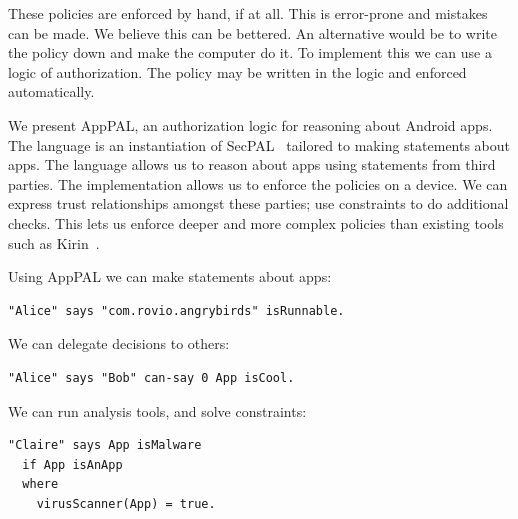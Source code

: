 \documentclass[]{scrartcl}
\newcommand{\comment}[1]{}%
\begin{document}
These policies are enforced by hand, if at all.
This is error-prone and mistakes can be made.
We believe this can be bettered.
An alternative would be to write the policy down and make the computer do it.
To implement this we can use a logic of authorization.
The policy may be written in the logic and enforced automatically.


We present AppPAL, an authorization logic for reasoning about Android apps.
The language is an instantiation of SecPAL~\citep{Becker:2006vh} tailored to making statements about apps.
The language allows us to reason about apps using statements from third parties.
The implementation allows us to enforce the policies on a device.
We can express trust relationships amongst these parties; use constraints to do additional checks.
This lets us enforce deeper and more complex policies than existing tools such as Kirin~\citep{Enck:2009ko}.

Using AppPAL we can make statements about apps:
\begin{lstlisting}
"Alice" says "com.rovio.angrybirds" isRunnable.
\end{lstlisting}
We can delegate decisions to others:
\begin{lstlisting}
"Alice" says "Bob" can-say 0 App isCool.
\end{lstlisting}
We can run analysis tools, and solve constraints:
\begin{lstlisting}
"Claire" says App isMalware
  if App isAnApp
  where
    virusScanner(App) = true.
\end{lstlisting}
\end{document}
